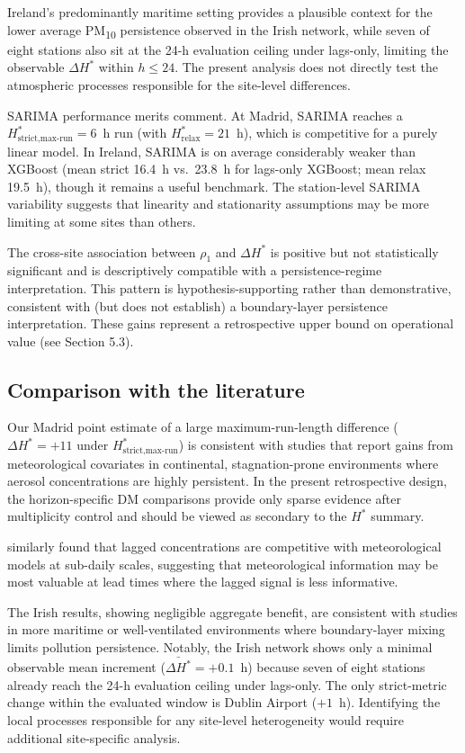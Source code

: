 \documentclass[12pt,a4paper]{article}
\newcommand{\PMten}{PM\textsubscript{10}}
\begin{document}
Ireland's predominantly maritime setting provides a plausible context for the
lower average \PMten{} persistence observed in the Irish network, while seven
of eight stations also sit at the 24-h evaluation ceiling under lags-only,
limiting the observable $\Delta H^*$ within $h\le 24$.  The present analysis
does not directly test the atmospheric processes responsible for the site-level
differences.

SARIMA performance merits comment.  At Madrid, SARIMA reaches a
$H^*_{\text{strict,max-run}}=6$~h run (with $H^*_{\text{relax}}=21$~h), which is
competitive for a purely linear model.  In Ireland, SARIMA is on average
considerably weaker than XGBoost (mean strict 16.4~h vs.\ 23.8~h for lags-only
XGBoost; mean relax 19.5~h), though it remains a useful benchmark.  The
station-level SARIMA variability suggests that linearity and stationarity
assumptions may be more limiting at some sites than others.

The cross-site association between $\rho_1$ and $\Delta H^*$ is positive but
not statistically significant and is descriptively compatible with a
persistence-regime interpretation. This pattern is hypothesis-supporting
rather than demonstrative, consistent with (but does not establish) a
boundary-layer persistence interpretation.  These gains represent a
retrospective upper bound on operational value (see Section 5.3).

\subsection{Comparison with the literature}

Our Madrid point estimate of a large maximum-run-length difference
($\Delta H^*=+11$ under $H^*_{\text{strict,max-run}}$) is consistent with studies
that report gains from meteorological covariates in continental,
stagnation-prone environments where aerosol concentrations are highly
persistent.  In the present retrospective design, the horizon-specific DM
comparisons provide only sparse evidence after multiplicity control and should
be viewed as secondary to the $H^*$ summary.

\citet{Bai2018} similarly found that lagged concentrations are competitive with
meteorological models at sub-daily scales, suggesting that meteorological
information may be most valuable at lead times where the lagged signal is less
informative.

The Irish results, showing negligible aggregate benefit, are consistent with
studies in more maritime or well-ventilated environments where boundary-layer
mixing limits pollution persistence.  Notably, the Irish network shows only a minimal observable mean increment
($\bar{\Delta H^*}=+0.1$~h) because seven of eight stations already reach the
24-h evaluation ceiling under lags-only.  The only strict-metric change within
the evaluated window is Dublin Airport ($+1$~h).  Identifying the local
processes responsible for any site-level heterogeneity would require
additional site-specific analysis.
\end{document}
